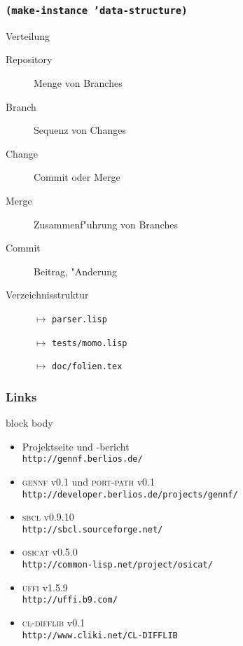 \documentclass[german, presentation]{beamer}
\newcommand{\GENNF}{\textsc{gennf}}
\begin{document}
\begin{frame}
 \frametitle{\tt (make-instance 'data-structure)}
 \begin{block}{Verteilung} 
   \begin{description}
   \item[\sf Repository] Menge von Branches
   \item[\sf Branch] Sequenz von Changes
   \item[\sf Change] Commit oder Merge
   \item[\sf Merge] Zusammenf"uhrung von Branches
   \item[\sf Commit] Beitrag, "Anderung
   \end{description}
 \end{block}
 \begin{block}{Verzeichnisstruktur} 
   \begin{description}
   \item[] $\mapsto$ \tt parser.lisp
   \item[] $\mapsto$ \tt tests/momo.lisp
   \item[] $\mapsto$ \tt doc/folien.tex
   \end{description}
 \end{block}
\end{frame}


\begin{frame}
  \frametitle{Links}
  \begin{beamercolorbox}{block body}
    \begin{itemize}
    \item Projektseite und -bericht \\ \texttt{http://gennf.berlios.de/}
    \item \GENNF{} v0.1 und \textsc{port-path} v0.1 \\
      \texttt{http://developer.berlios.de/projects/gennf/}
    \item \textsc{sbcl} v0.9.10 \\
      \texttt{http://sbcl.sourceforge.net/}
    \item \textsc{osicat} v0.5.0 \\
      \texttt{http://common-lisp.net/project/osicat/}
    \item \textsc{uffi} v1.5.9 \\
      \texttt{http://uffi.b9.com/}
    \item \textsc{cl-difflib} v0.1 \\
      \texttt{http://www.cliki.net/CL-DIFFLIB}
    \end{itemize}

    
  \end{beamercolorbox}
\end{frame}
\end{document}
